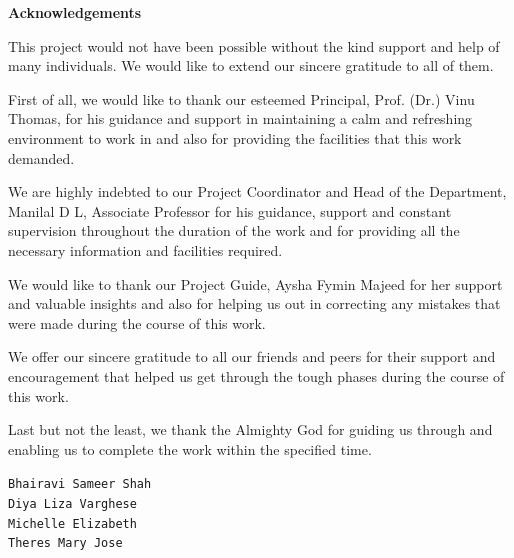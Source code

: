 \documentclass[11pt]{report}
\begin{document}
\begin{titlepage}
\vspace{.25in}	
\begin{center}
\textbf{Acknowledgements}\\
\end{center}
\normalsize

This project would not have been possible without the kind support and help of many individuals. We would like to extend our sincere gratitude to all of them.\vspace{.1in}

First of all, we would like to thank our esteemed Principal, Prof. (Dr.) Vinu Thomas, for his guidance and support in maintaining a calm and refreshing environment to work in and also for providing the facilities that this work demanded.\vspace{.1in}
  
We are highly indebted to our Project Coordinator and Head of the Department, Manilal D L, Associate Professor for his guidance, support and constant supervision throughout the duration of the work and for providing all the necessary information and facilities required.\vspace{.1in}

We would like to thank our Project Guide, Aysha Fymin Majeed for her support and valuable insights and also for helping us out in correcting any mistakes that were made during the course of this work.\vspace{.1in} 
  
We offer our sincere gratitude to all our friends and peers for their support and encouragement that helped us get through the tough phases during the course of this work.\vspace{.1in}
  
Last but not the least, we thank the Almighty God for guiding us through and enabling us to complete the work within the specified time.
\vspace{.25in}

\vspace{.25in}


\flushleft \small{\texttt{Bhairavi Sameer Shah}}\\
\flushleft \small{\texttt{Diya Liza Varghese}}\\
\flushleft \small{\texttt{Michelle Elizabeth}}\\
\flushleft \small{\texttt{Theres Mary Jose}} 
\end{titlepage}
\end{document}
